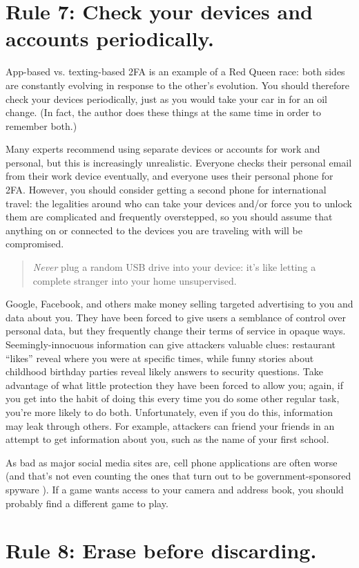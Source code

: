 \documentclass[10pt,letterpaper]{article}
\newcommand{\rulemajor}[1]{\section*{#1}}
\begin{document}
\rulemajor{Rule 7: Check your devices and accounts periodically.}

App-based vs. texting-based 2FA is an example of a Red Queen race:
both sides are constantly evolving in response to the other's evolution.
You should therefore check your devices periodically,
just as you would take your car in for an oil change.
(In fact,
the author does these things at the same time in order to remember both.)

Many experts recommend using separate devices or accounts for work and personal,
but this is increasingly unrealistic.
Everyone checks their personal email from their work device eventually,
and everyone uses their personal phone for 2FA.
However,
you should consider getting a second phone for international travel:
the legalities around who can take your devices
and/or force you to unlock them are complicated and frequently overstepped,
so you should assume that anything on or connected to the devices you are traveling with
will be compromised.

\begin{quote}
  \emph{Never} plug a random USB drive into your device:
  it's like letting a complete stranger into your home unsupervised.
\end{quote}

Google, Facebook, and others make money selling targeted advertising to you and data about you.
They have been forced to give users a semblance of control over personal data,
but they frequently change their terms of service in opaque ways.
Seemingly-innocuous information can give attackers valuable clues:
restaurant ``likes'' reveal where you were at specific times,
while funny stories about childhood birthday parties reveal likely answers to security questions.
Take advantage of what little protection they have been forced to allow you;
again,
if you get into the habit of doing this every time you do some other regular task,
you're more likely to do both.
Unfortunately,
even if you do this,
information may leak through others.
For example,
attackers can friend your friends in an attempt to get information about you,
such as the name of your first school.

As bad as major social media sites are,
cell phone applications are often worse
(and that's not even counting the ones that turn out to be government-sponsored spyware \cite{Schn2019}).
If a game wants access to your camera and address book,
you should probably find a different game to play.

\rulemajor{Rule 8: Erase before discarding.}
\end{document}

